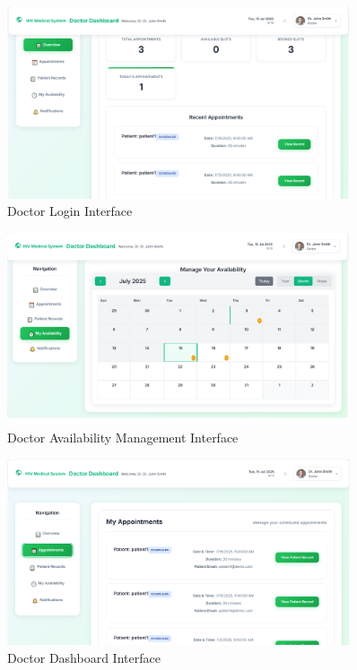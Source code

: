 \documentclass[12pt,a4paper]{article}
\begin{document}
\begin{figure}[H]
\centering
\includegraphics[width=0.9\textwidth]{images/doctor_login.png}
\caption{Doctor Login Interface}
\label{fig:doctor-login}
\end{figure}

\begin{figure}[H]
\centering
\includegraphics[width=0.9\textwidth]{images/doctor_availability.png}
\caption{Doctor Availability Management Interface}
\label{fig:doctor-availability}
\end{figure}

\begin{figure}[H]
\centering
\includegraphics[width=0.9\textwidth]{images/doctor_dashboard.png}
\caption{Doctor Dashboard Interface}
\label{fig:doctor-dashboard}
\end{figure}
\end{document}
